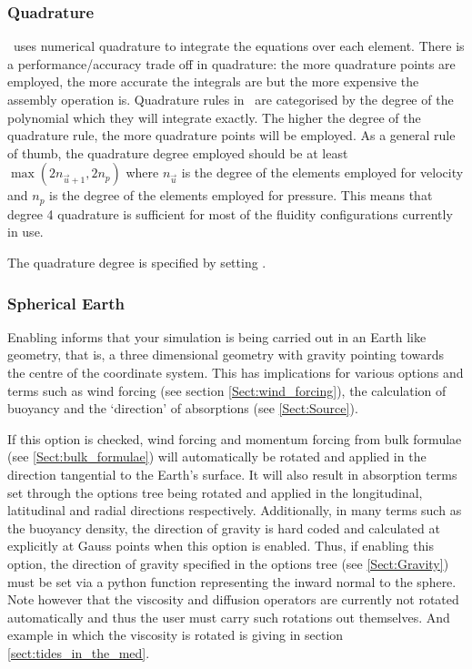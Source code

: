 \subsubsection{Quadrature}
\fluidity\ uses numerical quadrature to integrate the equations over each
element. There is a performance/accuracy trade off in quadrature: the more
quadrature points are employed, the more accurate the integrals are but
the more expensive the assembly operation is. Quadrature rules in \fluidity\ are categorised by the degree of the polynomial which they will integrate
exactly. The higher the degree of the quadrature rule, the more quadrature
points will be employed. As a general rule of thumb, the quadrature
degree employed should be at least $\max(2n_{\vec{u}+1},2n_p)$ where
$n_{\vec{u}}$ is the degree of the elements employed for velocity and $n_p$
is the degree of the elements employed for pressure. This means that degree
4 quadrature is sufficient for most of the fluidity configurations currently
in use.

The quadrature degree is specified by setting .

\subsubsection{Spherical Earth}

Enabling  informs \fluidity that your simulation is being carried out in an Earth like geometry, that is, a three dimensional geometry with gravity pointing towards the centre of the coordinate system. This has implications for various options and terms such as wind forcing (see section \ref{Sect:wind_forcing}), the calculation of buoyancy and the `direction' of absorptions (see \ref{Sect:Source}).

If this option is checked, wind forcing and \eg momentum forcing from bulk formulae (see \ref{Sect:bulk_formulae}) will automatically be rotated and applied in the direction tangential to the Earth's surface. It will also result in absorption terms set through the options tree being rotated and applied in the longitudinal, latitudinal and radial directions respectively. Additionally, in many terms such as the buoyancy density, the direction of gravity is hard coded and calculated at explicitly at Gauss points when this option is enabled. Thus, if enabling this option, the direction of gravity specified in the options tree (see \ref{Sect:Gravity}) must be set via a python function representing the inward normal to the sphere. Note however that the viscosity and diffusion operators are currently not rotated automatically and thus the user must carry such rotations out themselves. And example in which the viscosity is rotated is giving in section \ref{sect:tides_in_the_med}.


